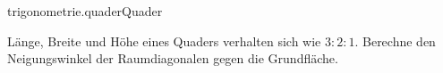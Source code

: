 \begin{exercise}{trigonometrie.quader}{Quader}
  \ifproblem\problem\par
    Länge, Breite und Höhe eines Quaders verhalten sich wie $3:2:1$.
    Berechne den Neigungswinkel der Raumdiagonalen gegen die Grundfläche.
  \fi
\end{exercise}
